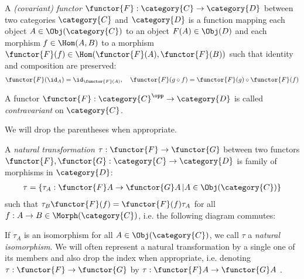 \documentclass[DIN, pagenumber=false, fontsize=11pt, parskip=half, colorinlistoftodos, svgnames]{scrartcl}
\begin{document}
	\begin{definition}[Functor]
		\label{def: functor}
		A \emph{(covariant) functor} $\functor{F}: \category{C} \rightarrow \category{D} $ between two categories $\category{C}$ and $\category{D} $ is a function mapping each object $A \in  \Obj(\category{C}) $ to an object $F(A) \in \Obj(D) $ and each morphism $ f \in \Hom(A,B) $ to a morphism $\functor{F}(f) \in \Hom(\functor{F}(A), \functor{F}(B))$ such that identity and composition are preserved:
		\begin{align*}
			\functor{F}(\id_A) = \id_{\functor{F}(A)},
			\quad
			\functor{F}(g\circ f) = \functor{F}(g) \circ \functor{F}(f)
		\end{align*}
		
		A functor $\functor{F}: \category{C}^\opp \rightarrow \category{D} $ is called \emph{contravariant} on $\category{C} $.
		
		We will drop the parentheses when appropriate.
	\end{definition}
	
	
	\begin{definition}
		\label{def: natTrans}
		A \emph{natural transformation} $\tau: \functor{F} \rightarrow \functor{G} $ between two functors $\functor{F}, \functor{G}: \category{C} \rightarrow \category{D} $ is family of morphisms in $\category{D}$:
		\begin{align*}
			\tau = \{ \tau_A : \functor{F}A \rightarrow \functor{G}A \,| A \in \Obj(\category{C})\}
		\end{align*}
		such that $\tau_B\functor{F}(f) = \functor{F}(f)\tau_A $ for all $f: A \rightarrow B \in \Morph(\category{C}) $, i.e. the following diagram commutes:
		
		\begin{center}
		\end{center}
		
		If $\tau_A$ is an isomorphism for all $A \in \Obj(\category{C}) $, we call $\tau$ a \emph{natural} \emph{isomorphism}.
		We will often represent a natural transformation by a single one of its members and also drop the index when appropriate, i.e. denoting 
		$\tau: \functor{F} \rightarrow \functor{G} $ 
		by 
		$\tau : \functor{F}A \rightarrow \functor{G}A $ .
	\end{definition}
	
\end{document}

